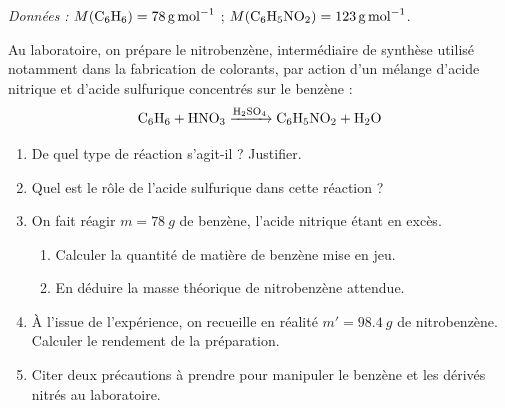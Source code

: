 \documentclass[11pt]{article}
\begin{document}
\begin{exercice}
\emph{Données :} $M(\ce{C6H6}) = \SI{78}{g.mol^{-1}}$ ; $M(\ce{C6H5NO2}) = \SI{123}{g.mol^{-1}}$.

Au laboratoire, on prépare le nitrobenzène, intermédiaire de synthèse utilisé notamment dans la fabrication de colorants, par action d'un mélange d'acide nitrique et d'acide sulfurique concentrés sur le benzène :
\[ \ce{C6H6 + HNO3 ->[H2SO4] C6H5NO2 + H2O} \]
\begin{enumerate}
\item De quel type de réaction s'agit-il ? Justifier.
\item Quel est le rôle de l'acide sulfurique dans cette réaction ?
\item On fait réagir $m = \SI{78}{g}$ de benzène, l'acide nitrique étant en excès.
\begin{enumerate}
\item Calculer la quantité de matière de benzène mise en jeu.
\item En déduire la masse théorique de nitrobenzène attendue.
\end{enumerate}
\item À l'issue de l'expérience, on recueille en réalité $m' = \SI{98,4}{g}$ de nitrobenzène. Calculer le rendement de la préparation.
\item Citer deux précautions à prendre pour manipuler le benzène et les dérivés nitrés au laboratoire.
\end{enumerate}
\end{exercice}
\end{document}
